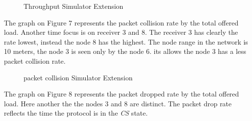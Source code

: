\documentclass[conference]{IEEEtran}
\begin{document}
\begin{figure}[H]
	\centering	 
	\caption{Throughput Simulator Extension}%
\end{figure}

The graph on Figure 7 represents the packet collision rate by the total offered load. Another time focus is on receiver 3 and 8. The receiver 3 has clearly the rate lowest, instead the node 8 has the highest. The node range in the network is 10 meters, the node 3 is seen only by the node 6. its allows the node 3 has a less packet collision rate.

\begin{figure}[H]
	\centering	 
	\caption{packet collision Simulator Extension}%
\end{figure}

The graph on Figure 8 represents the packet dropped rate by the total offered load. Here another the the nodes 3 and 8 are distinct. The packet drop rate reflects the time the protocol is in the \textit{CS} state.
 
\end{document}
